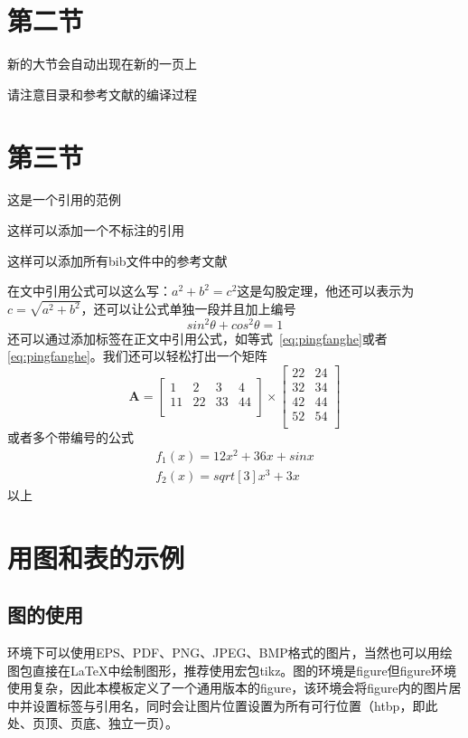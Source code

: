 \documentclass[a4paper,cs4size,UTF8,winfonts,boldfont,slantfont]{ctexart}
\begin{document}
	\section{第二节}
		新的大节会自动出现在新的一页上
		
		请注意目录和参考文献的编译过程
	\section{第三节}
	这是一个引用的范例\cite{Stone_1998}
	
	这样可以添加一个不标注的引用\nocite{9787508342894}
	
	这样可以添加所有bib文件中的参考文献\nocite{*}
	
	在文中引用公式可以这么写：$a^2+b^2=c^2$这是勾股定理，他还可以表示为$c=\sqrt{a^2+b^2}$，还可以让公式单独一段并且加上编号
	\begin{equation}
	sin^2{\theta}+cos^2{\theta}=1 \label{eq:pingfanghe}
	\end{equation}
	还可以通过添加标签在正文中引用公式，如等式~\eqref{eq:pingfanghe}或者\autoref{eq:pingfanghe}。我们还可以轻松打出一个矩阵
	\begin{equation}
	\bm{A}=\begin{bmatrix}
	1&2&3&4\\
	11&22&33&44\\
	\end{bmatrix}
	\times\begin{bmatrix}
	22&24\\
	32&34\\
	42&44\\
	52&54\\
	\end{bmatrix}
	\end{equation}
	或者多个带编号的公式
	\begin{eqnarray}
	f_1(x)=12x^2+36x+sinx\\
	f_2(x)=sqrt[3]{x^3+3x}
	\end{eqnarray}
	以上
	
	\section{用图和表的示例}
	\subsection{图的使用}
	\XeLaTeX 环境下可以使用EPS、PDF、PNG、JPEG、BMP格式的图片，当然也可以用绘图包直接在\LaTeX 中绘制图形，推荐使用宏包tikz。图的环境是figure但figure环境使用复杂，因此本模板定义了一个通用版本的figure，该环境会将figure内的图片居中并设置标签与引用名，同时会让图片位置设置为所有可行位置（htbp，即此处、页顶、页底、独立一页）。
	
\end{document}
